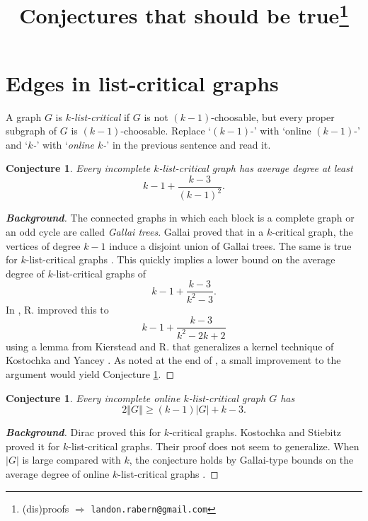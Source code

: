 \documentclass[12pt]{article}
\title{Conjectures that should be true\thanks{(dis)proofs $\Rightarrow$ \texttt{landon.rabern@gmail.com}}}
\theoremstyle{plain}
\newtheorem{conjecture}[thm]{Conjecture}
\theoremstyle{definition}
\theoremstyle{remark}
\newcommand{\card}[1]{\left|#1\right|}
\newcommand{\size}[1]{\left\Vert#1\right\Vert}
\begin{document}
\maketitle


\section{Edges in list-critical graphs}
A graph $G$ is \emph{$k$-list-critical} if $G$ is not $(k-1)$-choosable, but every
proper subgraph of $G$ is $(k-1)$-choosable.  Replace `$(k-1)$-' with `online $(k-1)$-' and `\emph{$k$-}' with `\emph{online $k$-}' in the previous sentence and read it.

\begin{conjecture}\label{C1}
Every incomplete $k$-list-critical graph has average degree at least \[k-1 + \frac{k-3}{(k-1)^2}.\]
\end{conjecture}
\begin{proof}[\textbf{Background}]
The connected graphs in which each block is a complete graph or an odd cycle are called \emph{Gallai trees}.  Gallai \cite{gallai1963kritische} proved that in a $k$-critical graph, 
the vertices of degree $k-1$ induce a disjoint union of Gallai trees.  The same is true for $k$-list-critical graphs \cite{borodin1977criterion, erdos1979choosability}. 
This quickly implies a lower bound on the average degree of $k$-list-critical graphs of \[k-1 + \frac{k-3}{k^2-3}.\]
In \cite{rabern2016better}, R. improved this to \[k-1 + \frac{k-3}{k^2-2k+2}\] using a lemma from Kierstead and R. \cite{KernelMagic} that generalizes a kernel technique of Kostochka and Yancey \cite{kostochkayancey2012ore}.
As noted at the end of \cite{rabern2016better}, a small improvement to the argument would yield Conjecture \ref{C1}.  
\end{proof}

\begin{conjecture}
Every incomplete online $k$-list-critical graph $G$ has \[2\size{G} \ge (k-1)\card{G} + k-3.\]
\end{conjecture}\label{C2}
\begin{proof}[\textbf{Background}]
Dirac \cite{dirac1957theorem} proved this for $k$-critical graphs.  Kostochka and Stiebitz \cite{kostochka2002list} proved it for $k$-list-critical graphs.  Their proof does not seem to generalize.
When $\card{G}$ is large compared with $k$, the conjecture holds by Gallai-type bounds on the average degree of online $k$-list-critical graphs \cite{OreVizing,DischargingLowerBound}.
\end{proof}
\end{document}
